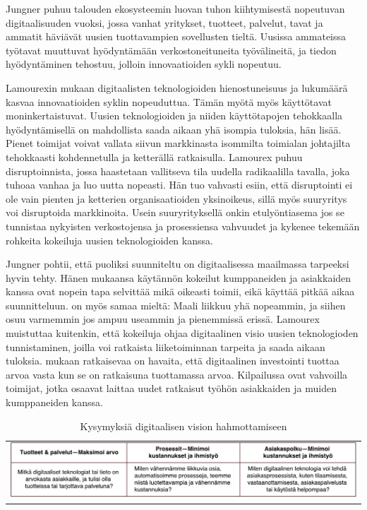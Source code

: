 \documentclass[finnish,12pt,a4paper,pdftex]{article}
\begin{document}
Jungner \citeyearpar{jungner} puhuu talouden ekosysteemin luovan tuhon kiihtymisestä nopeutuvan digitaalisuuden vuoksi, jossa vanhat yritykset, tuotteet, palvelut, tavat ja ammatit häviävät uusien tuottavampien sovellusten tieltä. Uusissa ammateissa työtavat muuttuvat hyödyntämään verkostoneituneita työvälineitä, ja tiedon hyödyntäminen tehostuu, jolloin innovaatioiden sykli nopeutuu. 

Lamourexin \citeyearpar{lamoureux} mukaan digitaalisten teknologioiden hienostuneisuus ja lukumäärä kasvaa innovaatioiden syklin nopeuduttua. Tämän myötä myös käyttötavat moninkertaistuvat. Uusien teknologioiden ja niiden käyttötapojen tehokkaalla hyödyntämisellä on mahdollista saada aikaan yhä isompia tuloksia, hän lisää. Pienet toimijat voivat vallata siivun markkinasta isommilta toimialan johtajilta tehokkaasti kohdennetulla ja ketterällä ratkaisulla. Lamourex \citeyearpar{lamoureux} puhuu disruptoinnista, jossa haastetaan vallitseva tila uudella radikaalilla tavalla, joka tuhoaa vanhaa ja luo uutta nopeasti. Hän tuo vahvasti esiin, että disruptointi ei ole vain pienten ja ketterien organisaatioiden yksinoikeus, sillä myös suuryritys voi disruptoida markkinoita. Usein suuryrityksellä onkin etulyöntiasema jos se tunnistaa nykyisten verkostojensa ja prosessiensa vahvuudet ja kykenee tekemään rohkeita kokeiluja uusien teknologioiden kanssa. 

Jungner \citeyearpar{jungner} pohtii, että puoliksi suunniteltu on digitaalisessa maailmassa tarpeeksi hyvin tehty. Hänen mukaansa käytännön kokeilut kumppaneiden ja asiakkaiden kanssa ovat nopein tapa selvittää mikä oikeasti toimii, eikä käyttää pitkää aikaa suunnitteluun. \citeauthor{devops} \citeyearpar{devops} on myös samaa mieltä: Maali liikkuu yhä nopeammin, ja siihen osuu varmemmin jos ampuu useammin ja pienemmissä erissä. Lamourex \citeyearpar{lamoureux} muistuttaa kuitenkin, että kokeiluja ohjaa digitaalinen visio uusien teknologioden tunnistaminen, joilla voi ratkaista liiketoiminnan tarpeita ja saada aikaan tuloksia. \citeauthor{gandhi} \citeyearpar{gandhi} mukaan ratkaisevaa on havaita, että digitaalinen investointi tuottaa arvoa vasta kun se on ratkaisuna tuottamassa arvoa. Kilpailussa ovat vahvoilla toimijat, jotka osaavat laittaa uudet ratkaisut työhön asiakkaiden ja muiden kumppaneiden kanssa.

\begin{table}[]
    \centering
    \begin{tabular}{l}
       \includegraphics[scale=0.45]{images/priorisointi.pdf}
    \end{tabular}
    \caption{Kysymyksiä digitaalisen vision hahmottamiseen \citep{lamoureux}}
    \label{tab:digkys}
\end{table}
\end{document}
